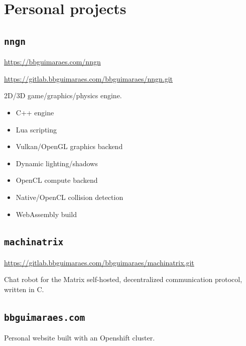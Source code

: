 \section*{Personal projects}
\subsection*{\texttt{nngn}}

\url{https://bbguimaraes.com/nngn}

\url{https://gitlab.bbguimaraes.com/bbguimaraes/nngn.git}

2D/3D game/graphics/physics engine.

\begin{itemize}[noitemsep]
    \item C++ engine
    \item Lua scripting
    \item Vulkan/OpenGL graphics backend
    \item Dynamic lighting/shadows
    \item OpenCL compute backend
    \item Native/OpenCL collision detection
    \item WebAssembly build
\end{itemize}

\subsection*{\texttt{machinatrix}}

\url{https://gitlab.bbguimaraes.com/bbguimaraes/machinatrix.git}

Chat robot for the Matrix self-hosted, decentralized communication protocol,
written in C.

\subsection*{\texttt{bbguimaraes.com}}

Personal website built with an Openshift cluster.

